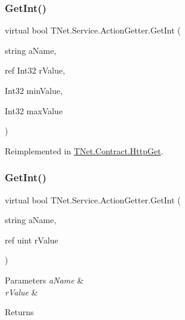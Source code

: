 \subsubsection{\texorpdfstring{Get\+Int()}{GetInt()}\hspace{0.1cm}{\footnotesize\ttfamily [3/5]}}
{\footnotesize\ttfamily virtual bool T\+Net.\+Service.\+Action\+Getter.\+Get\+Int (\begin{DoxyParamCaption}\item[{string}]{a\+Name,  }\item[{ref Int32}]{r\+Value,  }\item[{Int32}]{min\+Value,  }\item[{Int32}]{max\+Value }\end{DoxyParamCaption})\hspace{0.3cm}{\ttfamily [virtual]}}







Reimplemented in \mbox{\hyperlink{class_t_net_1_1_contract_1_1_http_get_a32e7dc20ec1a36fc86762d34c02dcadb}{T\+Net.\+Contract.\+Http\+Get}}.

\mbox{\label{class_t_net_1_1_service_1_1_action_getter_af1ffcdde2c5c28dc8171ae816fb1aa25}} 
\subsubsection{\texorpdfstring{Get\+Int()}{GetInt()}\hspace{0.1cm}{\footnotesize\ttfamily [4/5]}}
{\footnotesize\ttfamily virtual bool T\+Net.\+Service.\+Action\+Getter.\+Get\+Int (\begin{DoxyParamCaption}\item[{string}]{a\+Name,  }\item[{ref uint}]{r\+Value }\end{DoxyParamCaption})\hspace{0.3cm}{\ttfamily [virtual]}}






\begin{DoxyParams}{Parameters}
{\em a\+Name} & \\
\hline
{\em r\+Value} & \\
\hline
\end{DoxyParams}
\begin{DoxyReturn}{Returns}

\end{DoxyReturn}


